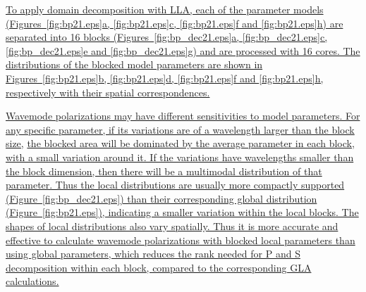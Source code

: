\documentclass[manuscript,ulem,graphix,revised]{geophysics}
\begin{document}
\marginnote{[29]}\uline{
To apply domain decomposition with LLA, each of the parameter models (Figures~\ref{fig:bp21.eps}a, \ref{fig:bp21.eps}c, \ref{fig:bp21.eps}f and \ref{fig:bp21.eps}h) are separated into 16 blocks (Figures~\ref{fig:bp_dec21.eps}a, \ref{fig:bp_dec21.eps}c, \ref{fig:bp_dec21.eps}e and \ref{fig:bp_dec21.eps}g) and are processed with 16 cores. 
The distributions of the blocked model parameters are shown in Figures~\ref{fig:bp21.eps}b, \ref{fig:bp21.eps}d, \ref{fig:bp21.eps}f and \ref{fig:bp21.eps}h, respectively with their spatial correspondences. }

\marginnote{[29]}\uline{
Wavemode polarizations may have different sensitivities to model parameters. For any specific parameter, if its variations are of a wavelength larger than the block size,}\marginnote{[3]} \uline{the blocked area will be dominated by the average parameter in each block, with a small variation around it. If the variations have wavelengths 
smaller than the block dimension, then there will be a multimodal distribution of that parameter.
Thus the local distributions are usually more compactly supported (Figure~\ref{fig:bp_dec21.eps}) than their corresponding global distribution (Figure~\ref{fig:bp21.eps}), indicating a smaller variation within the local blocks. The shapes of local distributions also vary spatially. 
Thus it is more accurate and effective to calculate wavemode polarizations with blocked local parameters than using global parameters,}\marginnote{[1]}\uline{ which reduces the rank needed for P and S decomposition  within each block, compared to the corresponding GLA calculations.
}
\end{document}

